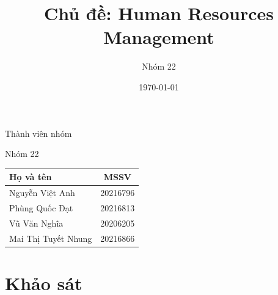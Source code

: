 \documentclass{beamer}
\title[{\makebox[.15\paperwidth]{Human Resources Management}}]{Chủ đề: Human Resources Management}
\author[Nhóm 22]{Nhóm 22}
\date[Data Warehouse \& BI]{\today}
\begin{document}
\begin{frame}
\titlepage
\end{frame}
\begin{frame}{Thành viên nhóm}
\begin{block}{Nhóm 22}
\centering
\begin{tabular} {|l|c|}
\hline
Họ và tên & MSSV \\
\hline
Nguyễn Việt Anh & 20216796 \\
Phùng Quốc Đạt & 20216813 \\
Vũ Văn Nghĩa & 20206205 \\
Mai Thị Tuyết Nhung & 20216866 \\
\hline
\end{tabular}
\end{block}
\end{frame}
\section{Khảo sát}
\end{document}
